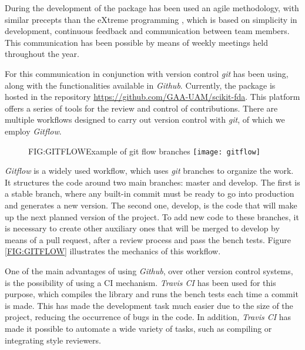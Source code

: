 During the development of the package has been used an agile methodology, with
similar precepts than the eXtreme programming \cite{eXtreme}, which is based on
simplicity in development, continuous feedback and communication between
team members. This communication has been possible by means of weekly meetings held throughout the year.

For this communication in conjunction with version control \textit{git} has been using,
along with the functionalities available in \textit{Github}. 
Currently, the package is hosted in the repository \href{https://github.com/GAA-UAM/scikit-fda}{https://github.com/GAA-UAM/scikit-fda}.
 This platform offers a
series of tools for the review and control of contributions. There are multiple
workflows designed to carry out version control with \textit{git}, of which we employ
\textit{Gitflow}.


\begin{figure}[Example of git flow branches]{FIG:GITFLOW}{Example of git flow branches \footnotemark}
	\texttt{[image: gitflow]}
\end{figure}

\textit{Gitflow} is a widely used workflow, which uses \textit{git} branches to organize the work.
It structures the code around two main branches: master and develop. The first
is a stable branch, where any built-in commit must be ready to go into
production and generates a new version. The second one, develop, is the code
that will make up the next planned version of the project. To add new code to
these branches, it is necessary to create other auxiliary ones that will be
merged to develop by means of a pull request, after a review process and pass
the bench tests. Figure \ref{FIG:GITFLOW} illustrates the mechanics of this
workflow.




One of the main advantages of using \textit{Github}, over other version control systems,
is the possibility of using a \ac{CI} mechanism. \textit{Travis CI} has
been used for this purpose, 
which compiles the library and runs the bench tests
each time a commit is made. This has made the development task much easier due to the size of the project, reducing the occurrence of bugs in the code.
In addition, \textit{Travis CI} has made it possible to automate a wide variety of tasks, such as compiling or integrating style reviewers.

